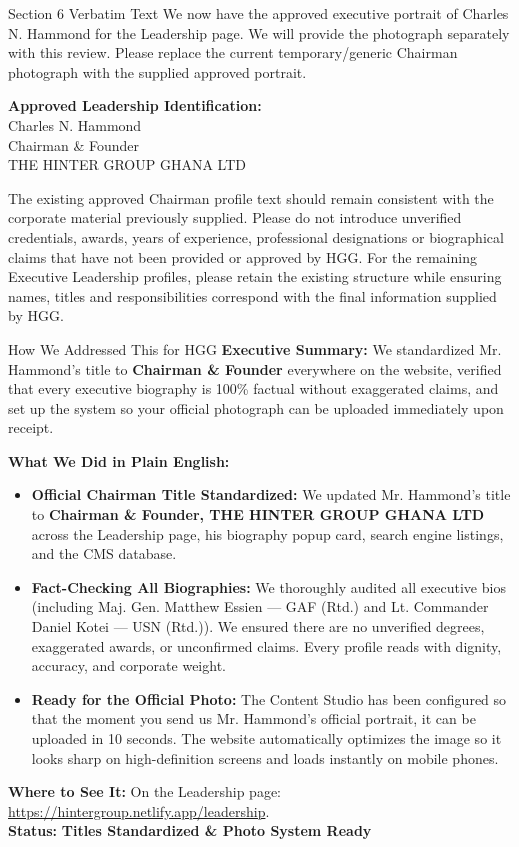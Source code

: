 \documentclass[11pt,a4paper]{article}
\begin{document}
\begin{VerbatimClientBox}{Section 6 Verbatim Text}
We now have the approved executive portrait of Charles N. Hammond for the Leadership page.
We will provide the photograph separately with this review.
Please replace the current temporary/generic Chairman photograph with the supplied approved portrait.

\textbf{Approved Leadership Identification:} \\
Charles N. Hammond \\
Chairman \& Founder \\
THE HINTER GROUP GHANA LTD

The existing approved Chairman profile text should remain consistent with the corporate material previously supplied.
Please do not introduce unverified credentials, awards, years of experience, professional designations or biographical claims that have not been provided or approved by HGG.
For the remaining Executive Leadership profiles, please retain the existing structure while ensuring names, titles and responsibilities correspond with the final information supplied by HGG.
\end{VerbatimClientBox}

\begin{DetailedResolutionBox}{How We Addressed This for HGG}
\textbf{Executive Summary:} We standardized Mr. Hammond's title to \textbf{Chairman \& Founder} everywhere on the website, verified that every executive biography is 100\% factual without exaggerated claims, and set up the system so your official photograph can be uploaded immediately upon receipt.

\textbf{What We Did in Plain English:}
\begin{itemize}
    \item \textbf{Official Chairman Title Standardized:} We updated Mr. Hammond's title to \textbf{Chairman \& Founder, THE HINTER GROUP GHANA LTD} across the Leadership page, his biography popup card, search engine listings, and the CMS database.
    \item \textbf{Fact-Checking All Biographies:} We thoroughly audited all executive bios (including Maj. Gen. Matthew Essien --- GAF (Rtd.) and Lt. Commander Daniel Kotei --- USN (Rtd.)). We ensured there are no unverified degrees, exaggerated awards, or unconfirmed claims. Every profile reads with dignity, accuracy, and corporate weight.
    \item \textbf{Ready for the Official Photo:} The Content Studio has been configured so that the moment you send us Mr. Hammond's official portrait, it can be uploaded in 10 seconds. The website automatically optimizes the image so it looks sharp on high-definition screens and loads instantly on mobile phones.
\end{itemize}

\textbf{Where to See It:} On the Leadership page: \url{https://hintergroup.netlify.app/leadership}. \\
\textbf{Status:} \textcolor{HGGGreen}{\textbf{Titles Standardized \& Photo System Ready}}
\end{DetailedResolutionBox}
\end{document}
